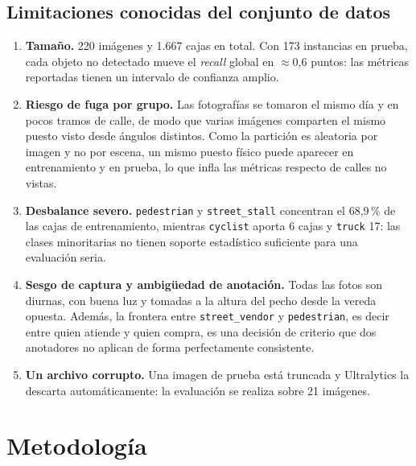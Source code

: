 \documentclass[10pt,a4paper]{article}
\begin{document}
\subsection{Limitaciones conocidas del conjunto de datos}
\begin{enumerate}[leftmargin=*]
  \item \textbf{Tamaño.} 220 imágenes y 1{.}667 cajas en total. Con 173 instancias en
        prueba, cada objeto no detectado mueve el \emph{recall} global en $\approx$0{,}6
        puntos: las métricas reportadas tienen un intervalo de confianza amplio.
  \item \textbf{Riesgo de fuga por grupo.} Las fotografías se tomaron el mismo día y en
        pocos tramos de calle, de modo que varias imágenes comparten el mismo puesto
        visto desde ángulos distintos. Como la partición es aleatoria por imagen y no por
        escena, un mismo puesto físico puede aparecer en entrenamiento y en prueba, lo
        que infla las métricas respecto de calles no vistas.
  \item \textbf{Desbalance severo.} \texttt{pedestrian} y \texttt{street\_stall}
        concentran el 68{,}9\,\% de las cajas de entrenamiento, mientras \texttt{cyclist}
        aporta 6 cajas y \texttt{truck} 17: las clases minoritarias no tienen soporte
        estadístico suficiente para una evaluación seria.
  \item \textbf{Sesgo de captura y ambigüedad de anotación.} Todas las fotos son diurnas,
        con buena luz y tomadas a la altura del pecho desde la vereda opuesta. Además, la
        frontera entre \texttt{street\_vendor} y \texttt{pedestrian}, es decir entre
        quien atiende y quien compra, es una decisión de criterio que dos anotadores no
        aplican de forma perfectamente consistente.
  \item \textbf{Un archivo corrupto.} Una imagen de prueba está truncada y Ultralytics
        la descarta automáticamente: la evaluación se realiza sobre 21 imágenes.
\end{enumerate}

\section{Metodología}
\end{document}
